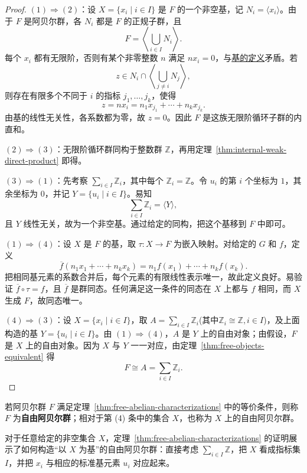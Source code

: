 \begin{proof}
$(1)\Rightarrow(2)$：设 $X=\{x_i\mid i\in I\}$ 是 $F$ 的一个非空基，记 $N_i=\langle x_i\rangle$。由于 $F$ 是阿贝尔群，各 $N_i$ 都是 $F$ 的正规子群，且
\[
  F=\left\langle\bigcup_{i\in I}N_i\right\rangle.
\]
每个 $x_i$ 都有无限阶，否则有某个非零整数 $n$ 满足 $nx_i=0$，与\hyperref[def:abelian-group-basis]{基的定义}矛盾。若
\[
  z\in N_i\cap\left\langle\bigcup_{j\ne i}N_j\right\rangle,
\]
则存在有限多个不同于 $i$ 的指标 $j_1,\ldots,j_k$，使得
\[
  z=nx_i=n_1x_{j_1}+\cdots+n_kx_{j_k}.
\]
由基的线性无关性，各系数都为零，故 $z=0$。因此 $F$ 是这族无限阶循环子群的内直和。

$(2)\Rightarrow(3)$：无限阶循环群同构于整数群 $\mathbb Z$，再用定理~\ref{thm:internal-weak-direct-product} 即得。

$(3)\Rightarrow(1)$：先考察 $\sum_{i\in I}\mathbb Z_i$，其中每个 $\mathbb Z_i=\mathbb Z$。令 $u_i$ 的第 $i$ 个坐标为 $1$，其余坐标为 $0$，并记 $Y=\{u_i\mid i\in I\}$。易知
\[
  \sum_{i\in I}\mathbb Z_i=\langle Y\rangle,
\]
且 $Y$ 线性无关，故为一个非空基。通过给定的同构，把这个基移到 $F$ 中即可。

$(1)\Rightarrow(4)$：设 $X$ 是 $F$ 的基，取 $\tau:X\rightarrow F$ 为嵌入映射。对给定的 $G$ 和 $f$，定义
\[
  \overline f(n_1x_1+\cdots+n_kx_k)
  =n_1f(x_1)+\cdots+n_kf(x_k).
\]
把相同基元素的系数合并后，每个元素的有限线性表示唯一，故此定义良好。易验证 $\overline f\circ\tau=f$，且 $\overline f$ 是群同态。任何满足这一条件的同态在 $X$ 上都与 $f$ 相同，而 $X$ 生成 $F$，故同态唯一。

$(4)\Rightarrow(3)$：设 $X=\{x_i\mid i\in I\}$，取 $A=\sum_{i\in I}\mathbb Z_i$(其中$\mathbb Z_i \cong \mathbb Z, i\in I$)，及上面构造的基 $Y=\{u_i\mid i\in I\}$。由 $(1)\Rightarrow(4)$，$A$ 是 $Y$ 上的自由对象；由假设，$F$ 是 $X$ 上的自由对象。因为 $X$ 与 $Y$ 一一对应，由定理~\ref{thm:free-objects-equivalent} 得
\[
  F\cong A=\sum_{i\in I}\mathbb Z_i.
\]
\end{proof}

\begin{definition}[自由阿贝尔群]\label{def:free-abelian-group}
若阿贝尔群 $F$ 满足定理~\ref{thm:free-abelian-characterizations} 中的等价条件，则称 $F$ 为\textbf{自由阿贝尔群}；相对于第 (4) 条中的集合 $X$，也称为 $X$ 上的自由阿贝尔群。
\end{definition}

\begin{purplenote}
对于任意给定的非空集合 $X$，定理~\ref{thm:free-abelian-characterizations} 的证明展示了如何构造“以 $X$ 为基”的自由阿贝尔群：直接考虑 $\sum_{i\in I}\mathbb Z$，把 $X$ 看成指标集 $I$，并把 $x_i$ 与相应的标准基元素 $u_i$ 对应起来。
\end{purplenote}

